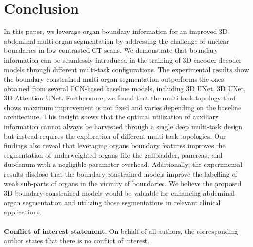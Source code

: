 \documentclass[final,5p,times,twocolumn]{elsarticle}
\begin{document}
\section{Conclusion}\label{sec:conc}
In this paper, we leverage organ boundary information for an improved 3D abdominal multi-organ segmentation by addressing the challenge of unclear boundaries in low-contrasted CT scans. We demonstrate that boundary information can be seamlessly introduced in the training of 3D encoder-decoder models through different multi-task configurations. The experimental results show the boundary-constrained multi-organ segmentation outperforms the ones obtained from several FCN-based baseline models, including 3D UNet, 3D UNet, 3D Attention-UNet. Furthermore, we found that the multi-task topology that shows maximum improvement is not fixed and varies depending on the baseline architecture. This insight shows that the optimal utilization of auxiliary information cannot always be harvested through a single deep multi-task design but instead requires the exploration of different multi-task topologies. Our findings also reveal that leveraging organs boundary features improves the segmentation of underweighted organs like the gallbladder, pancreas, and duodenum with a negligible parameter-overhead. Additionally, the experimental results disclose that the boundary-constrained models improve the labelling of weak sub-parts of organs in the vicinity of boundaries. We believe the proposed 3D boundary-constrained models would be valuable for enhancing abdominal organ segmentation and utilizing those segmentations in relevant clinical applications.\\\\
\textbf{Conflict of interest statement:} On behalf of all authors, the corresponding author states that there is no conflict of interest.
 

\end{document}
